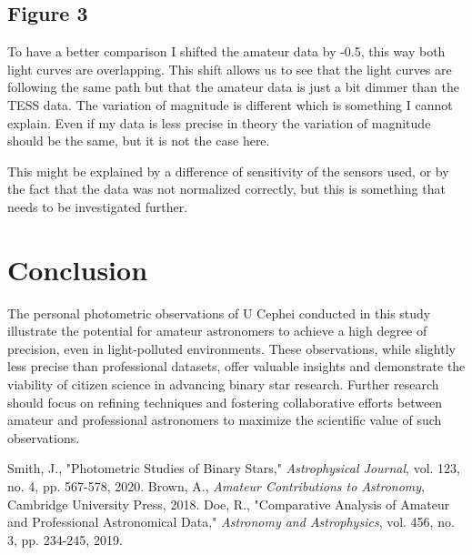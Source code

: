 \documentclass[12pt,a4paper]{article}
\begin{document}
\subsection{Figure 3}

To have a better comparison I shifted the amateur data by -0.5, this way both light curves are overlapping. This shift allows us to see that the light curves are following the same path but that the amateur data is just a bit dimmer than the TESS data.
The variation of magnitude is different which is something I cannot explain. Even if my data is less precise in theory the variation of magnitude should be the same, but it is not the case here.

This might be explained by a difference of sensitivity of the sensors used, or by the fact that the data was not normalized correctly, but this is something that needs to be investigated further.

\section{Conclusion}
The personal photometric observations of U Cephei conducted in this study illustrate the potential for amateur astronomers to achieve a high degree of precision, even in light-polluted environments. These observations, while slightly less precise than professional datasets, offer valuable insights and demonstrate the viability of citizen science in advancing binary star research. Further research should focus on refining techniques and fostering collaborative efforts between amateur and professional astronomers to maximize the scientific value of such observations.

\begin{thebibliography}{99}
 Smith, J., "Photometric Studies of Binary Stars," \textit{Astrophysical Journal}, vol. 123, no. 4, pp. 567-578, 2020.
 Brown, A., \textit{Amateur Contributions to Astronomy}, Cambridge University Press, 2018.
 Doe, R., "Comparative Analysis of Amateur and Professional Astronomical Data," \textit{Astronomy and Astrophysics}, vol. 456, no. 3, pp. 234-245, 2019.
\end{thebibliography}
\end{document}
